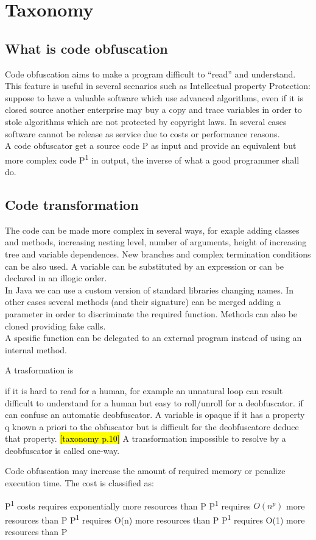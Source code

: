 \chapter{Taxonomy}
\section{What is code obfuscation}
Code obfuscation aims to make a program difficult to “read” and understand. This feature is useful in several scenarios such as Intellectual property Protection: suppose to have a valuable software which use advanced algorithms, even if it is closed source another enterprise may buy a copy and trace variables in order to stole algorithms which are not protected by copyright laws. In several cases software cannot be release as service due to costs or performance reasons.\\
A code obfuscator get a source code P as input and provide an equivalent but more complex code P\textsuperscript{1} in output, the inverse of what a good programmer shall do. \\
\cite{collberg1997taxonomy}
\section{Code transformation}	
The code can be made more complex in several ways, for exaple adding classes and methods, increasing nesting level, number of arguments, height of increasing tree and variable dependences. New branches and complex termination conditions can be also used.  A variable can be substituted by an expression or can be declared in an illogic order.\\
In Java we can use a custom version of standard libraries changing names. In other cases several methods (and their signature) can be merged adding a parameter in order to discriminate the required function. Methods can also be cloned providing fake calls.\\
A spesific function can be delegated to an external program instead of using an internal method.

A trasformation is
\begin{itemize}
 if it is hard to read for a human, for example an unnatural loop can result difficult to understand for a human but easy to roll/unroll for a deobfuscator.
 if can confuse an automatic deobfuscator. A variable is opaque if it has a property q known a priori to the obfuscator but is difficult for the deobfuscatore deduce that property. \hl{[taxonomy p.10]} A transformation impossible to resolve by a deobfuscator is called one-way.
\end{itemize}
Code obfuscation may increase the amount of required memory or penalize execution time. The cost is classified as:
\begin{itemize}
 P\textsuperscript{1} costs requires exponentially more resources than P
 P\textsuperscript{1} requires $O(n^{p})$ more resources than P 
 P\textsuperscript{1} requires O(n) more resources than P 
 P\textsuperscript{1} requires O(1) more resources than P
\end{itemize}


